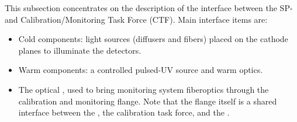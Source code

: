 This subsection concentrates on the description of the interface between the SP- and Calibration/Monitoring Task Force (CTF).
 Main interface items are:
\begin{itemize}
    \item Cold components: light sources (diffusers and fibers) placed on the cathode planes to illuminate the detectors.
    \item Warm components: a controlled pulsed-UV source and warm optics. 
    \item The optical \fdth, used to  bring monitoring system fiberoptics through the calibration and monitoring flange.  Note that the flange itself is a shared interface between the , the calibration task force, and the .
\end{itemize}






